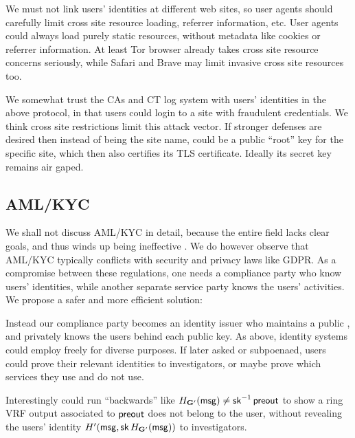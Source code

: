 We must not link users' identities at different web sites, so user agents
should carefully limit cross site resource loading, referrer information, etc.
User agents could always load purely static resources, without metadata
like cookies or referrer information.
At least Tor browser already takes cross site resource concerns seriously,
while Safari and Brave may limit invasive cross site resources too.

We somewhat trust the CAs and CT log system with users' identities in
the above protocol, in that users could login to a site with fraudulent
credentials.  We think cross site restrictions limit this attack vector.
If stronger defenses are desired then instead of \msg being the site name,
\msg could be a public ``root'' key for the specific site, which then
also certifies its TLS certificate.  Ideally its secret key remains air gaped.


\subsection{AML/KYC}
\label{subsec:AML_KYC}

We shall not discuss AML/KYC in detail, because the entire field lacks
clear goals, and thus winds up being ineffective
 \cite{doi:10.1080/25741292.2020.1725366}.
We do however observe that AML/KYC typically conflicts with security
and privacy laws like GDPR.  As a compromise between these regulations,
one needs a compliance party who know users' identities,
 while another separate service party knows the users' activities.
We propose a safer and more efficient solution:

Instead our compliance party becomes an identity issuer who maintains
a public \ring, and privately knows the users behind each public key.
As above, identity systems could employ \ring freely for diverse purposes.
If later asked or subpoenaed, users could prove their relevant identities
to investigators, or maybe prove which services they use and do not use. 

Interestingly \PedVRF could run ``backwards'' like
 $H_{{\mathbf{G}}'}(\mathsf{msg}) \ne \mathsf{sk}^{-1} \, {\mathsf{preout}}$
to show a ring VRF output associated to ${\mathsf{preout}}$
does not belong to the user, without revealing the users'
identity $H'(\mathsf{msg}, \mathsf{sk} \, H_{{\mathbf{G}}'}(\mathsf{msg}))$ to investigators. 

